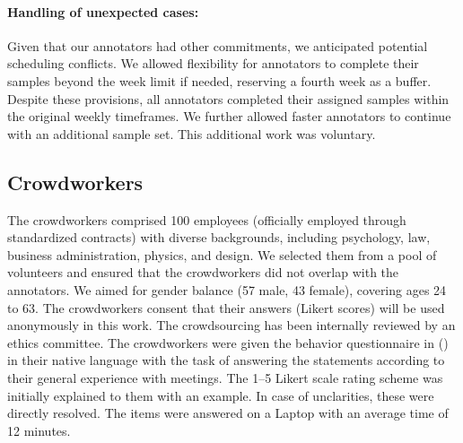 \paragraph{Handling of unexpected cases:}
Given that our annotators had other commitments, we anticipated potential scheduling conflicts. 
We allowed flexibility for annotators to complete their samples beyond the week limit if needed, reserving a fourth week as a buffer. 
Despite these provisions, all annotators completed their assigned samples within the original weekly timeframes. 
We further allowed faster annotators to continue with an additional sample set.
This additional work was voluntary.


\subsection{Crowdworkers}
The crowdworkers comprised 100 employees (officially employed through standardized contracts) with diverse backgrounds, including psychology, law, business administration, physics, and design.
We selected them from a pool of volunteers and ensured that the crowdworkers did not overlap with the annotators.
We aimed for gender balance (57 male, 43 female), covering ages 24 to 63.
The crowdworkers consent that their answers (Likert scores) will be used anonymously in this work.
The crowdsourcing has been internally reviewed by an ethics committee.
The crowdworkers were given the behavior questionnaire in  () in their native language with the task of answering the statements according to their general experience with meetings.
The 1--5 Likert scale rating scheme was initially explained to them with an example.
In case of unclarities, these were directly resolved.
The items were answered on a Laptop with an average time of 12 minutes.